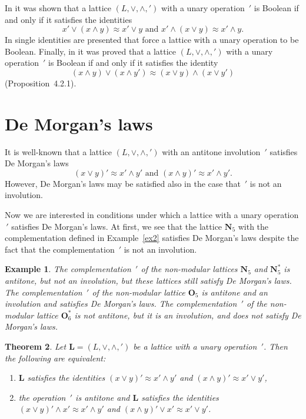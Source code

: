 \documentclass[12pt]{article}
\newtheorem{theorem}{Theorem}[section]
\newtheorem{example}[theorem]{Example}
\begin{document}
In \cite{CP} it was shown that a lattice $(L,\vee,\wedge,{}')$ with a unary operation $\,'$ is Boolean if and only if it satisfies the identities
\[
x'\vee(x\wedge y)\approx x'\vee y\text{ and }x'\wedge(x\vee y)\approx x'\wedge y.
\]
In \cite{CLP} single identities are presented that force a lattice with a unary operation to be Boolean. Finally, in \cite{PR} it was proved that a lattice $(L,\vee,\wedge,{}')$ with a unary operation $\,'$ is Boolean if and only if it satisfies the identity
\[
(x\wedge y)\vee(x\wedge y')\approx(x\vee y)\wedge(x\vee y')
\]
(Proposition~4.2.1).

\section{De Morgan's laws}

It is well-known that a lattice $(L,\vee,\wedge,{}')$ with an antitone involution $\,'$ satisfies De Morgan's laws
\[
(x\vee y)'\approx x'\wedge y'\text{ and }(x\wedge y)'\approx x'\wedge y'.
\]
However, De Morgan's laws may be satisfied also in the case that $\,'$ is not an involution.

Now we are interested in conditions under which a lattice with a unary operation $\,'$ satisfies De Morgan's laws. At first, we see that the lattice $\mathbf N_5$ with the complementation defined in Example~\ref{ex2} satisfies De Morgan's laws despite the fact that the complementation $\,'$ is not an involution.

\begin{example}\label{ex1}
The complementation $\,'$ of the non-modular lattices $\mathbf N_5$ and $\mathbf N_5^*$ is antitone, but not an involution, but these lattices still satisfy De Morgan's laws. The complementation $\,'$ of the non-modular lattice $\mathbf O_5$ is antitone and an involution and satisfies De Morgan's laws. The complementation $\,'$ of the non-modular lattice $\mathbf O_6^*$ is not antitone, but it is an involution, and does not satisfy De Morgan's laws.
\end{example}

\begin{theorem}\label{th4}
Let $\mathbf L=(L,\vee,\wedge,{}')$ be a lattice with a unary operation $\,'$. Then the following are equivalent:
\begin{enumerate}[{\rm(i)}]
\item $\mathbf L$ satisfies the identities $(x\vee y)'\approx x'\wedge y'$ and $(x\wedge y)'\approx x'\vee y'$,
\item the operation $\,'$ is antitone and $\mathbf L$ satisfies the identities $(x\vee y)'\wedge x'\approx x'\wedge y'$ and $(x\wedge y)'\vee x'\approx x'\vee y'$.
\end{enumerate}
\end{theorem}
\end{document}
